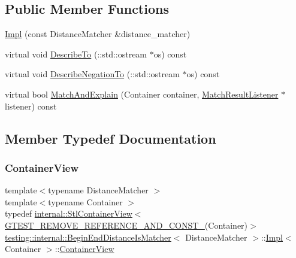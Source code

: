 \subsection*{Public Member Functions}
\begin{DoxyCompactItemize}
\item 
\hyperlink{classtesting_1_1internal_1_1_begin_end_distance_is_matcher_1_1_impl_a92f5afc23d317260d4a5bd091d2904a4}{Impl} (const Distance\+Matcher \&distance\+\_\+matcher)
\item 
virtual void \hyperlink{classtesting_1_1internal_1_1_begin_end_distance_is_matcher_1_1_impl_a5ca27760e15a4f151cd0b964d724c6cf}{Describe\+To} (\+::std\+::ostream $\ast$os) const
\item 
virtual void \hyperlink{classtesting_1_1internal_1_1_begin_end_distance_is_matcher_1_1_impl_a359711f21b6f116a5233fca78736fa47}{Describe\+Negation\+To} (\+::std\+::ostream $\ast$os) const
\item 
virtual bool \hyperlink{classtesting_1_1internal_1_1_begin_end_distance_is_matcher_1_1_impl_aa7bda59eae256018247699b0baa285c9}{Match\+And\+Explain} (Container container, \hyperlink{classtesting_1_1_match_result_listener}{Match\+Result\+Listener} $\ast$listener) const
\end{DoxyCompactItemize}


\subsection{Member Typedef Documentation}
\mbox{\label{classtesting_1_1internal_1_1_begin_end_distance_is_matcher_1_1_impl_a5c76ede38c6143430f56e02e9024f535}} 
\subsubsection{\texorpdfstring{Container\+View}{ContainerView}}
{\footnotesize\ttfamily template$<$typename Distance\+Matcher $>$ \\
template$<$typename Container $>$ \\
typedef \hyperlink{classtesting_1_1internal_1_1_stl_container_view}{internal\+::\+Stl\+Container\+View}$<$ \hyperlink{gtest-internal_8h_a874567b176266188fabfffb8393267ce}{G\+T\+E\+S\+T\+\_\+\+R\+E\+M\+O\+V\+E\+\_\+\+R\+E\+F\+E\+R\+E\+N\+C\+E\+\_\+\+A\+N\+D\+\_\+\+C\+O\+N\+S\+T\+\_\+}(Container)$>$ \hyperlink{classtesting_1_1internal_1_1_begin_end_distance_is_matcher}{testing\+::internal\+::\+Begin\+End\+Distance\+Is\+Matcher}$<$ Distance\+Matcher $>$\+::\hyperlink{classtesting_1_1internal_1_1_begin_end_distance_is_matcher_1_1_impl}{Impl}$<$ Container $>$\+::\hyperlink{classtesting_1_1internal_1_1_begin_end_distance_is_matcher_1_1_impl_a5c76ede38c6143430f56e02e9024f535}{Container\+View}}

